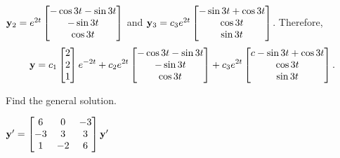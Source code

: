 \documentclass{ximera}
\begin{document}
\begin{problem}
\begin{solution}
${\bf y}_2=e^{2t} \begin{bmatrix}-\cos3t-\sin3t\\-\sin3t\\
\cos3t \end{bmatrix}$ and ${\bf y}_3=
c_3e^{2t} \begin{bmatrix}-\sin3t+\cos3t\\\cos3t\\
\sin3t \end{bmatrix}$. Therefore,  
$$
 {\bf
y}=c_1 \begin{bmatrix} 2\\ 2\\1  \end{bmatrix}e^{-2t}+
c_2e^{2t} \begin{bmatrix}-\cos3t-\sin3t\\-\sin3t\\
\cos3t \end{bmatrix}+c_3e^{2t} \begin{bmatrix}{c}
-\sin3t+\cos3t\\\cos3t\\\sin3t \end{bmatrix}.
$$

\end{solution}
\end{problem}
 


 \begin{problem}\label{exer:10.6.15}  
 Find the general solution.
 
 $ {\bf
y}'= \begin{bmatrix}6&0&-3\\-3&3&3\\1&-2&6\end{bmatrix}{\bf y}'$
\end{problem}
\end{document}
